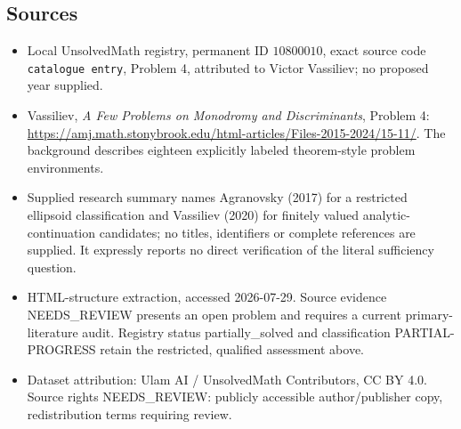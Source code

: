 \documentclass[11pt]{article}
\begin{document}
\subsection{Sources}
\begin{itemize}
\item Local UnsolvedMath registry, permanent ID \(10800010\), exact source code \texttt{catalogue entry}, Problem 4, attributed to Victor Vassiliev; no proposed year supplied.
\item Vassiliev, \emph{A Few Problems on Monodromy and Discriminants}, Problem 4: \url{https://amj.math.stonybrook.edu/html-articles/Files-2015-2024/15-11/}. The background describes eighteen explicitly labeled theorem-style problem environments.
\item Supplied research summary names Agranovsky (2017) for a restricted ellipsoid classification and Vassiliev (2020) for finitely valued analytic-continuation candidates; no titles, identifiers or complete references are supplied. It expressly reports no direct verification of the literal sufficiency question.
\item HTML-structure extraction, accessed 2026-07-29. Source evidence NEEDS\_REVIEW presents an open problem and requires a current primary-literature audit. Registry status partially\_solved and classification PARTIAL-PROGRESS retain the restricted, qualified assessment above.
\item Dataset attribution: Ulam AI / UnsolvedMath Contributors, CC BY 4.0. Source rights NEEDS\_REVIEW: publicly accessible author/publisher copy, redistribution terms requiring review.
\end{itemize}
\end{document}

